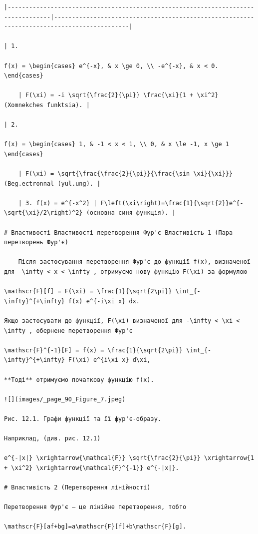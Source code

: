 \documentclass[
  ukrainian,
]{article}
\begin{document}
\begin{verbatim}
|----------------------------------------------------------------------------------|-------------------------------------------------------------------------------------------|

| 1.

f(x) = \begin{cases} e^{-x}, & x \ge 0, \\ -e^{-x}, & x < 0. \end{cases}

    | F(\xi) = -i \sqrt{\frac{2}{\pi}} \frac{\xi}{1 + \xi^2} (Xomnekches funktsia). |

| 2.

f(x) = \begin{cases} 1, & -1 < x < 1, \\ 0, & x \le -1, x \ge 1 \end{cases}

    | F(\xi) = \sqrt{\frac{\frac{2}{\pi}}{\frac{\sin \xi}{\xi}}} (Beg.ectronnal (yul.ung). |

    | 3. f(x) = e^{-x^2} | F\left(\xi\right)=\frac{1}{\sqrt{2}}e^{-\sqrt{\xi}/2\right)^2} (основна синя функція). |

# Властивості Властивості перетворення Фур'є Властивість 1 (Пара перетворень Фур'є)

    Після застосування перетворення Фур'є до функції f(x), визначеної для -\infty < x < \infty , отримуємо нову функцію F(\xi) за формулою

\mathscr{F}[f] = F(\xi) = \frac{1}{\sqrt{2\pi}} \int_{-\infty}^{+\infty} f(x) e^{-i\xi x} dx.

Якщо застосувати до функції, F(\xi) визначеної для -\infty < \xi < \infty , обернене перетворення Фур'є

\mathscr{F}^{-1}[F] = f(x) = \frac{1}{\sqrt{2\pi}} \int_{-\infty}^{+\infty} F(\xi) e^{i\xi x} d\xi,

**Тоді** отримуємо початкову функцію f(x).

![](images/_page_90_Figure_7.jpeg)

Рис. 12.1. Графи функції та її фур'є-образу.

Наприклад, (див. рис. 12.1)

e^{-|x|} \xrightarrow{\mathcal{F}} \sqrt{\frac{2}{\pi}} \xrightarrow{1 + \xi^2} \xrightarrow{\mathcal{F}^{-1}} e^{-|x|}.

# Властивість 2 (Перетворення лінійності)

Перетворення Фур'є — це лінійне перетворення, тобто

\mathscr{F}[af+bg]=a\mathscr{F}[f]+b\mathscr{F}[g].


\end{verbatim}
\end{document}
